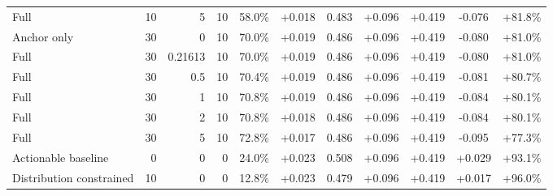 \begin{table}[htbp]
\begin{tabular}{lrrrccccccc}
Full & 10 & 5 & 10 & 58.0\% & +0.018 & 0.483 & +0.096 & +0.419 & -0.076 & +81.8\% \\
Anchor only & 30 & 0 & 10 & 70.0\% & +0.019 & 0.486 & +0.096 & +0.419 & -0.080 & +81.0\% \\
Full & 30 & 0.21613 & 10 & 70.0\% & +0.019 & 0.486 & +0.096 & +0.419 & -0.080 & +81.0\% \\
Full & 30 & 0.5 & 10 & 70.4\% & +0.019 & 0.486 & +0.096 & +0.419 & -0.081 & +80.7\% \\
Full & 30 & 1 & 10 & 70.8\% & +0.019 & 0.486 & +0.096 & +0.419 & -0.084 & +80.1\% \\
Full & 30 & 2 & 10 & 70.8\% & +0.018 & 0.486 & +0.096 & +0.419 & -0.084 & +80.1\% \\
Full & 30 & 5 & 10 & 72.8\% & +0.017 & 0.486 & +0.096 & +0.419 & -0.095 & +77.3\% \\
Actionable baseline & 0 & 0 & 0 & 24.0\% & +0.023 & 0.508 & +0.096 & +0.419 & +0.029 & +93.1\% \\
Distribution constrained & 10 & 0 & 0 & 12.8\% & +0.023 & 0.479 & +0.096 & +0.419 & +0.017 & +96.0\% \\
\bottomrule
\end{tabular}
\end{table}